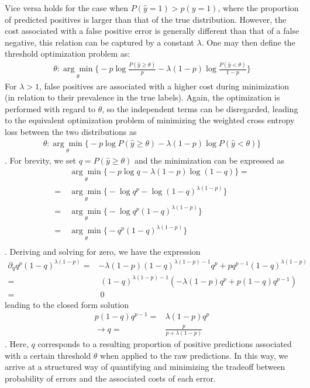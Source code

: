 \documentclass{article}
\begin{document}
Vice versa holds for the case when $P(\hat{y}=1) > p(y=1)$, where the proportion of predicted positives is larger than that of the true distribution.
However, the cost associated with a false positive error is generally different than that of a false negative, this relation can be captured by a constant $\lambda$. One may then define the threshold optimization problem as:  
\begin{align}
    \theta: \underset{\theta}{\arg \min} \Big\{ - p \log \frac{P(\hat{y}\geq \theta)}{p} - \lambda (1-p) \log \frac{P(\hat{y} < \theta)}{1-p} \Big \}
\end{align}
For $\lambda>1$, false positives are associated with a higher cost during minimization (in relation to their prevalence in the true labels).
Again, the optimization is performed with regard to $\theta$, so the independent terms can be disregarded, leading to the equivalent optimization problem of minimizing the weighted cross entropy loss between the two distributions as
\begin{align}
\label{eq:threshold} 
\theta: \underset{\theta}{\arg \min} \Big\{ - p \log P(\hat{y}\geq \theta) - \lambda (1-p) \log P(\hat{y} < \theta) \Big \} 
\end{align}.
For brevity, we set $q = P(\hat{y}\geq \theta)$ and the minimization can be expressed as
\begin{align*}
& \ \underset{\theta}{\arg \min} \Big\{ - p \log q - \lambda (1-p) \log (1-q) \Big \} = \\
=& \ \underset{\theta}{\arg \min} \Big\{ - \log q^p - \log (1-q)^{\lambda(1-p)} \Big \} \\
=& \ \underset{\theta}{\arg \min} \Big\{ - \log q^p (1-q)^{\lambda(1-p)} \Big \} \\
=& \ \underset{\theta}{\arg \min} \Big\{ - q^p (1-q)^{\lambda(1-p)} \Big \} \\
\end{align*}.
Deriving and solving for zero, we have the expression
\begin{align*}
\partial_q q^p (1-q)^{\lambda(1-p)} =& -\lambda(1-p)(1-q)^{\lambda(1-p)-1}q^p + pq^{p-1}(1-q)^{\lambda(1-p)} \\
=& \ (1-q)^{\lambda(1-p)-1}(-\lambda(1-p)q^p + p(1-q)q^{p-1}) \\
=& \ 0
\end{align*}
leading to the closed form solution
\begin{align}
p(1-q)q^{p-1} =& \lambda(1-p)q^p \\
\label{eq:pos}
\rightarrow q =& \frac{p}{p + \lambda(1-p)}
\end{align}.
Here, $q$ corresponds to a resulting proportion of positive predictions associated with a certain threshold $\theta$ when applied to the raw predictions.
In this way, we arrive at a structured way of quantifying and minimizing the tradeoff between probability of errors and the associated costs of each error.
\end{document}
